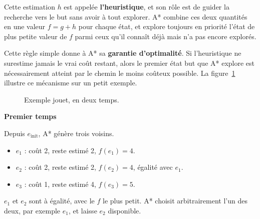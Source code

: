 \documentclass[11pt,a4paper]{article}
\begin{document}
\smallskip
\noindent Cette estimation $h$ est appelée \textbf{l'heuristique}, et son rôle est de guider la recherche vers le but sans avoir à tout explorer. A* combine ces deux quantités en une valeur $f = g + h$ pour chaque état, et explore toujours en priorité l'état de plus petite valeur de $f$ parmi ceux qu'il connaît déjà mais n'a pas encore explorés.

\smallskip
\indent
Cette règle simple donne à A* sa \textbf{garantie d'optimalité}. Si l'heuristique ne surestime jamais le vrai coût restant, alors le premier état but que A* explore est nécessairement atteint par le chemin le moins coûteux possible. La figure~\ref{fig:astar-toy} illustre ce mécanisme sur un petit exemple.

\begin{figure}[H]
\centering
{}
\caption{Exemple jouet, en deux temps.}
\label{fig:astar-toy}
\end{figure}

\textbf{Premier temps}

Depuis $e_{\text{init}}$, A* génère trois voisins.
\begin{itemize}
    \item $e_1$ : coût 2, reste estimé 2, $f(e_1) = 4$.
    \item $e_2$ : coût 2, reste estimé 2, $f(e_2) = 4$, égalité avec $e_1$.
    \item $e_3$ : coût 1, reste estimé 4, $f(e_3) = 5$.
\end{itemize}
$e_1$ et $e_2$ sont à égalité, avec le $f$ le plus petit. A* choisit arbitrairement l'un des deux, par exemple $e_1$, et laisse $e_2$ disponible.
\end{document}
